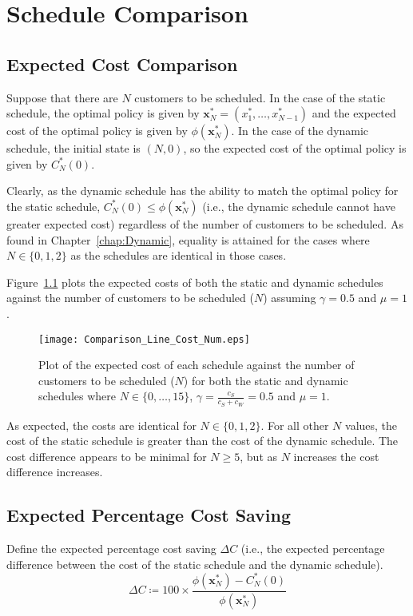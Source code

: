 \chapter{Schedule Comparison}
\section{Expected Cost Comparison}
Suppose that there are $N$ customers to be scheduled. In the case of the static schedule, the optimal policy is given by $\mathbf{x}_{N}^{*} = (x_{1}^{*}, \ldots, x_{N - 1}^{*})$ and the expected cost of the optimal policy is given by $\phi (\mathbf{x}_{N}^{*})$. In the case of the dynamic schedule, the initial state is $(N, 0)$, so the expected cost of the optimal policy is given by $C_{N}^{*} (0)$.

Clearly, as the dynamic schedule has the ability to match the optimal policy for the static schedule, $C_{N}^{*} (0) \leq \phi (\mathbf{x}_{N}^{*})$ (i.e., the dynamic schedule cannot have greater expected cost) regardless of the number of customers to be scheduled. As found in Chapter~\ref{chap:Dynamic}, equality is attained for the cases where $N \in \{ 0, 1, 2 \}$ as the schedules are identical in those cases.

Figure~\ref{Graph_Cost_Comparison} plots the expected costs of both the static and dynamic schedules against the number of customers to be scheduled ($N$) assuming $\gamma = 0.5$ and $\mu = 1$.
\begin{figure}[htb]
	\centering
	\texttt{[image: Comparison\_Line\_Cost\_Num.eps]}
	\caption{Plot of the expected cost of each schedule against the number of customers to be scheduled ($N$) for both the static and dynamic schedules where $N \in \{ 0, \ldots, 15 \}$, $\gamma = \frac{c_{S}}{c_{S} + c_{W}} = 0.5$ and $\mu = 1$.}
	\label{Graph_Cost_Comparison}
\end{figure}

As expected, the costs are identical for $N \in \{ 0, 1, 2 \}$. For all other $N$ values, the cost of the static schedule is greater than the cost of the dynamic schedule. The cost difference appears to be minimal for $N \geq 5$, but as $N$ increases the cost difference increases.

\section{Expected Percentage Cost Saving}
Define the expected percentage cost saving $\Delta C$ (i.e., the expected percentage difference between the cost of the static schedule and the dynamic schedule).
\begin{equation}
	\Delta C \coloneqq 100 \times \frac{\phi (\mathbf{x}_{N}^{*}) - C_{N}^{*} (0)}{\phi (\mathbf{x}_{N}^{*})}
\end{equation}


